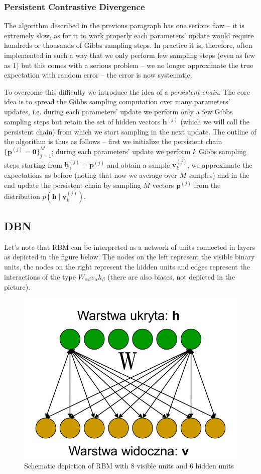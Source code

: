 \documentclass[a5paper]{article}
\begin{document}
\subsubsection{Persistent Contrastive Divergence}

The algorithm described in the previous paragraph has one serious flaw -- it is extremely slow, as
for it to work properly each parameters' update would require hundreds or thousands of Gibbs
sampling steps. In practice it is, therefore, often implemented in such a way that we only perform
few sampling steps (even as few as 1) but this comes with a serious problem -- we no longer
approximate the true expectation with random error -- the error is now systematic.

To overcome this difficulty we introduce the idea of a \emph{persistent chain}. The core idea is to
spread the Gibbs sampling computation over many parameters' updates, i.e. during each parameters'
update we perform only a few Gibbs sampling steps but retain the set of hidden vectors
\(\bm{h}^{(j)}\) (which we will call the persistent chain) from which we start sampling in the next
update. The outline of the algorithm is thus as follows -- first we initialize the persistent chain
\(\{\bm{p}^{(j)} = \bm{0}\}_{j=1}^M\); during each parameters' update we perform \(k\) Gibbs
sampling steps starting from \(\underline{\bm{h}}_1^{(j)} = \bm{p}^{(j)}\) and obtain a sample
\(\bm{v}_k^{(j)}\), we approximate the expectations as before (noting that now we average over \(M\)
samples) and in the end update the persistent chain by sampling \(M\) vectors \(\bm{p}^{(j)}\) from
the distribution \(p(\bm{h} \mid \underline{\bm{v}}_k^{(j)})\).


\subsection{DBN}

Let's note that RBM can be interpreted as a network of units connected in layers as depicted in the
figure below. The nodes on the left represent the visible binary units, the nodes on the right
represent the hidden units and edges represent the interactions of the type \(W_{\alpha\beta}
v_\alpha h _\beta\) (there are also biases, not depicted in the picture).

\begin{figure}[ht]
   \centering
   \includegraphics[width=0.55\columnwidth]{figs/rbm.png}
   \caption{Schematic depiction of RBM with 8 visible units and 6 hidden units \cite{Kurdziel}}
   \label{fig:rbm}
\end{figure}
\end{document}
